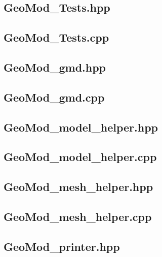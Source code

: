 \documentclass[a4paper, 12pt]{article}
\begin{document}
\subsection{GeoMod\_Tests.hpp} \label{subsec:Tests_hpp}

\subsection{GeoMod\_Tests.cpp} \label{subsec:Tests_cpp}


\subsection{GeoMod\_gmd.hpp} \label{subsec:gmd_hpp}

\subsection{GeoMod\_gmd.cpp} \label{subsec:gmd_cpp}


\subsection{GeoMod\_model\_helper.hpp} \label{subsec:model_hpp}

\subsection{GeoMod\_model\_helper.cpp} \label{subsec:model_cpp}


\subsection{GeoMod\_mesh\_helper.hpp} \label{subsec:mesh_hpp}

\subsection{GeoMod\_mesh\_helper.cpp} \label{subsec:mesh_cpp}


\subsection{GeoMod\_printer.hpp} \label{subsec:printer_hpp}

\end{document}

